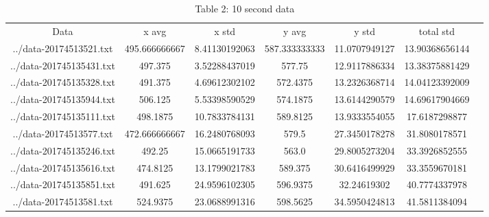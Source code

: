 \documentclass[12pt,letterpaper]{article}
\begin{document}
\begin{table}
\begin{tabular}{ccccccc}
Data & x avg & x std & y avg & y std & total std\\
../data-20174513521.txt & 495.666666667 & 8.41130192063 & 587.333333333 & 11.0707949127 & 13.90368656144\\
../data-201745135431.txt & 497.375 & 3.52288437019 & 577.75 & 12.9117886334 & 13.38375881429\\
../data-201745135328.txt & 491.375 & 4.69612302102 & 572.4375 & 13.2326368714 & 14.04123392009\\
../data-201745135944.txt & 506.125 & 5.53398590529 & 574.1875 & 13.6144290579 & 14.69617904669\\
../data-201745135111.txt & 498.1875 & 10.7833784131 & 589.8125 & 13.9333554055 & 17.6187298877\\
../data-20174513577.txt & 472.666666667 & 16.2480768093 & 579.5 & 27.3450178278 & 31.8080178571\\
../data-201745135246.txt & 492.25 & 15.0665191733 & 563.0 & 29.8005273204 & 33.3926852555\\
../data-201745135616.txt & 474.8125 & 13.1799021783 & 589.375 & 30.6416499929 & 33.3559670181\\
../data-201745135851.txt & 491.625 & 24.9596102305 & 596.9375 & 32.24619302 & 40.7774337978\\
../data-20174513581.txt & 524.9375 & 23.0688991316 & 598.5625 & 34.5950424813 & 41.5811384094\\
\end{tabular}
\caption{Table 2: 10 second data}
\end{table}
\end{document}

